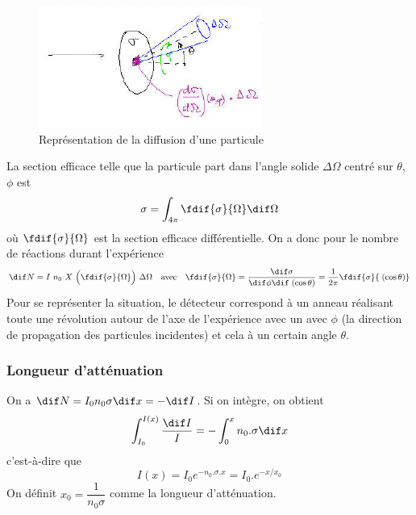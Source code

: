 \begin{figure}[ht]
    \centering
    \includegraphics[scale=0.95]{Images1/secdiff.PNG}
    \caption{Représentation de la diffusion d'une particule}
    \label{fig:diffusion_particule}
\end{figure}
\noindent La section efficace telle que la particule part dans l'angle solide $\Delta\Omega$ centré sur $\theta$, $\phi$ est
\[
    \sigma=\int_{4\pi}^{}\fdif{\sigma}{\Omega}\dif \Omega
\]
où $\fdif{\sigma}{\Omega}$ est la section efficace différentielle. On a donc pour le nombre de réactions durant l'expérience
\[
    \dif N=I~n_0~X~\Big(\fdif{\sigma}{\Omega}\Big)~\Delta\Omega \quad\text{avec}\quad \fdif{\sigma}{\Omega}=\dfrac{\dif\sigma}{\dif\phi \dif \;(\cos{\theta})}=\dfrac{1}{2\pi}\fdif{\sigma}{\;(\cos{\theta})}
\]
Pour se représenter la situation, le détecteur correspond à un anneau réalisant toute une révolution autour de l'axe de l'expérience avec un avec $\phi$ (la direction de propagation des particules incidentes) et cela à un certain angle $\theta$.

\subsubsection{Longueur d'atténuation}
On a $\dif N=I_0 n_0 \sigma \dif x=-\dif I$. Si on intègre, on obtient
\[
    \int_{I_{0}}^{I(x)}\dfrac{\dif I}{I}=-\int_0^x n_0.\sigma \dif x
\]
c'est-à-dire que
\[
    I(x)=I_0e^{-n_0.\sigma.x}=I_0.e^{-x/x_0}
\]
On définit $x_0=\dfrac{1}{n_0\sigma}$ comme la longueur d'atténuation.

